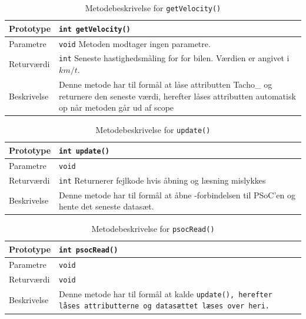 \begin{table}[h]
	\begin{tabularx}{\textwidth}{| L{2.5 cm} | Z |} \hline
		Prototype 	& \texttt{int getVelocity()} \\\hline
		Parametre 	& \texttt{void} \newline Metoden modtager ingen parametre. \\\hline
		Returværdi 	& \texttt{int}  \newline Seneste hastighedsmåling for for bilen. Værdien er angivet i $km/t$. \\\hline
		Beskrivelse	& Denne metode har til formål at låse attributten Tacho\_ og returnere den seneste værdi, herefter låses attributten automatisk op når metoden går ud af scope \\\hline	
	\end{tabularx}
	\caption{Metodebeskrivelse for  \texttt{getVelocity()}}
	\label{table:met_getvelocity}
\end{table}

\begin{table}[h]
	\begin{tabularx}{\textwidth}{| L{2.5 cm} | Z |} \hline
		Prototype 	& \texttt{int update()} 		\\\hline
		Parametre 	& \texttt{void} \newline 		\\\hline
		Returværdi 	& \texttt{int}  \newline Returnerer fejlkode hvis åbning og læsning mislykkes \\\hline
		Beskrivelse	& Denne metode har til formål at åbne \IIC-forbindelsen til PSoC'en og hente det seneste datasæt. \\\hline
	\end{tabularx}
	\caption{Metodebeskrivelse for  \texttt{update()}}
	\label{table:met_update}
\end{table}
\clearpage

\begin{table}[h]
	\begin{tabularx}{\textwidth}{| L{2.5 cm} | Z |} \hline
		Prototype 	& \texttt{int psocRead()} 		\\\hline
		Parametre 	& \texttt{void} \newline 		\\\hline
		Returværdi 	& \texttt{void} \newline 		\\\hline
		Beskrivelse	& Denne metode har til formål at kalde \texttt{update(), herefter låses attributterne og datasættet læses over heri.}\\\hline
	\end{tabularx}
	\caption{Metodebeskrivelse for  \texttt{psocRead()}}
	\label{table:met_psocRead}
\end{table}
\clearpage